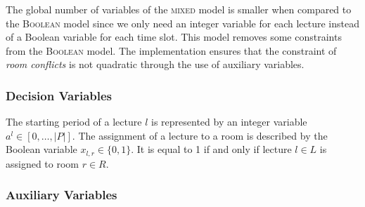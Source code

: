 \documentclass[twocolumn,natbib]{svjour3}          %
\newcounter{constraint}
\begin{document}
The global number of variables of the \textsc{mixed} model is smaller when compared to the \textsc{Boolean} model since we only need an integer variable for each lecture instead of a Boolean variable for each time slot. This model removes some constraints from the \textsc{Boolean} model. The implementation ensures that the constraint of {\em room conflicts} is not quadratic through the use of auxiliary variables.


\subsubsection{Decision Variables}

The starting period of a lecture $l$ is represented by an integer variable $a^l \in [0, \ldots, |P|]$. The assignment of a lecture to a room is described by the Boolean variable $x_{l,r} \in \{0, 1\}$. It is equal to 1 if and only if lecture $l \in L$ is assigned to room $r \in R$. 


\subsubsection{Auxiliary Variables} 
\end{document}
